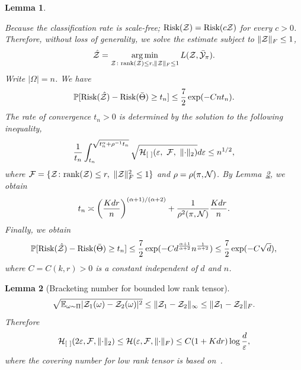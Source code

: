 \documentclass{article}
\theoremstyle{plain}
\newtheorem{lem}{Lemma}
\theoremstyle{definition}
\begin{document}
\begin{lem}\label{lem:tensor}

Because the classification rate is scale-free; $\text{Risk}(\mathcal{Z})=\text{Risk}(c\mathcal{Z})$ for every $c>0$. Therefore, without loss of generality, we solve the estimate subject to $\lVert\mathcal{Z}\rVert_F\leq 1$,
\[
\hat {\mathcal{Z}}=\operatorname*{arg\,min}_{\mathcal{Z}\colon \textup{rank}(\mathcal{Z})\leq r, \lVert\mathcal{Z}\rVert_F\leq 1}L(\mathcal{Z},\bar {\mathcal{Y}}_\pi).
\]
Write $|\Omega|=n$. We have
\[
\mathbb{P}[\textup{Risk}(\hat {\mathcal{Z}})-\textup{Risk}(\bar \Theta)\geq t_n]\leq {7\over 2}\exp(-Cnt_n).
\]
The rate of convergence $t_n>0$ is determined by the solution to the following inequality,
\[
{1\over t_n}\int^{\sqrt{t_n^\alpha+\rho^{-1}t_n}}_{t_n} \sqrt{\tH_{[\ ]}(\varepsilon,\ \tF,\ \vnormSize{}{\cdot}) }d\varepsilon \leq n^{1/2}, 
\]
where $\mathcal{F}=\{\mathcal{Z}\colon \textup{rank}(\mathcal{Z})\leq r, \ \lVert\mathcal{Z}\rVert_F^2\leq 1\}$ and $\rho=\rho(\pi, \mathcal{N})$. By Lemma~\ref{lem:bracketing}, we obtain 
\[
t_n\asymp \left({Kdr\over n}\right)^{(\alpha+1)/(\alpha+2)} +{1\over \rho^2(\pi, \mathcal{N})} {Kdr\over n}.
\] 
Finally, we obtain
\[
\mathbb{P}[\textup{Risk}(\hat {\mathcal{Z}})-\textup{Risk}(\bar \Theta)\geq t_n]\leq {7\over 2}\exp(-Cd^{\alpha+1\over \alpha+2}n^{1\over \alpha+2}) \leq {7\over 2}\exp(-C\sqrt{d}),
\]
where $C=C(k,r)>0$ is a constant independent of $d$ and $n$.  
\end{lem}

\begin{lem}[Bracketing number for bounded low rank tensor]\label{lem:bracketing}
\[
\sqrt{\mathbb{E}_{\omega\sim \Pi}|\mathcal{Z}_1(\omega)-\mathcal{Z}_2(\omega)|^2} \leq \lVert\mathcal{Z}_1-\mathcal{Z}_2\rVert_\infty \leq \lVert\mathcal{Z}_1-\mathcal{Z}_2\rVert_F.
\]
Therefore
\[
\mathcal{H}_{[\ ]}(2\varepsilon, \mathcal{F}, \lVert\cdot\rVert_2)\leq \mathcal{H}(\varepsilon, \mathcal{F}, \lVert\cdot\rVert_F) \leq C{(1+Kdr)\log {d\over \varepsilon}},
\]
where the covering number for low rank tensor is based on~\citet{mu2014square,9119759}.
\end{lem}
\endgroup






\appendix
\end{document}
